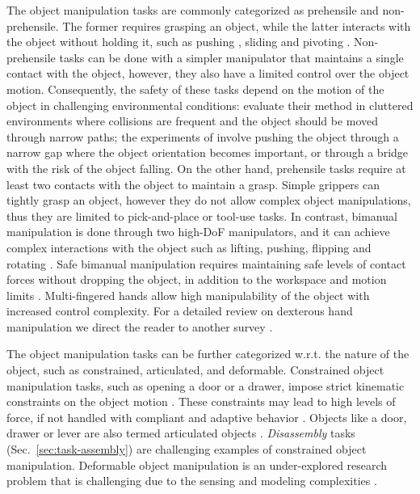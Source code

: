 \documentclass[Afour,sageh,times]{template/sagej}
\newcommand{\suggest}[1]{{\color{olive} (#1)}}
\begin{document}
The object manipulation tasks are commonly categorized as prehensile and non-prehensile. The former requires grasping an object, while the latter interacts with the object without holding it, such as pushing \citep{94, 99}, sliding \citep{81} and pivoting \citep{145}. 
Non-prehensile tasks can be done with a simpler manipulator that maintains a single contact with the object, however, they also have a limited control over the object motion. Consequently, the safety of these tasks depend on the motion of the object in challenging environmental conditions: \cite{99} evaluate their method in cluttered environments where collisions are frequent and the object should be moved through narrow paths; the experiments of \cite{94} involve pushing the object through a narrow gap where the object orientation becomes important, or through a bridge with the risk of the object falling. 
On the other hand, prehensile tasks require at least two contacts with the object to maintain a grasp. 
Simple grippers can tightly grasp an object, however they do not allow complex object manipulations, thus they are limited to pick-and-place or tool-use tasks.
In contrast, bimanual manipulation is done through two high-DoF manipulators, and it can achieve complex interactions with the object such as lifting, pushing, flipping and rotating \citep{22, 53}.
Safe bimanual manipulation requires maintaining safe levels of contact forces without dropping the object, in addition to the workspace and motion limits \citep{22}.
Multi-fingered hands allow high manipulability of the object with increased control complexity. For a detailed review on dexterous hand manipulation we direct the reader to another survey \citep{huang2025human}.

The object manipulation tasks can be further categorized w.r.t. the nature of the object, such as constrained, articulated, and deformable.
Constrained object manipulation tasks, such as opening a door or a drawer, impose strict kinematic constraints on the object motion \citep{86}. These constraints may lead to high levels of force, if not handled with compliant and adaptive behavior \citep{36}. Objects like a door, drawer or lever are also termed articulated objects \citep{7}. %
\textit{Disassembly} tasks (Sec.~\ref{sec:task-assembly}) are challenging examples of constrained object manipulation. 
Deformable object manipulation is an under-explored research problem that is challenging due to the sensing and modeling complexities \citep{zhu2022challenges}.
\end{document}
